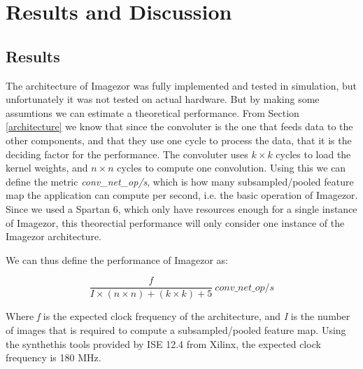 \chapter{Results and Discussion} \label{chap_results}

\section{Results}

The architecture of Imagezor was fully implemented and tested in simulation, but unfortunately it was not tested on actual hardware. But by making some assumtions we can estimate a theoretical performance. From Section \ref{architecture} we know that since the convoluter is the one that feeds data to the other components, and that they use one cycle to process the data, that it is the deciding factor for the performance. The convoluter uses $ k \times k $ cycles to load the kernel weights, and $ n \times n $ cycles to compute one convolution.  Using this we can define the metric \textit{conv\_net\_op/s}, which is how many subsampled/pooled feature map the application can compute per second, i.e. the basic operation of Imagezor. Since we used a Spartan 6, which only have resources enough for a single instance of Imagezor, this theorectial performance will only consider one instance of the Imagezor architecture.  

We can thus define the performance of Imagezor as:

\begin{equation} \label{eq_theoretical_performance}
\frac{f}{I\times(n \times n) + (k \times k) + 5} ~conv\_net\_op/s
\end{equation}

Where \textit{f} is the expected clock frequency of the architecture, and \textit{I} is the number of images that is required to compute a subsampled/pooled feature map. Using the synthethis tools provided by ISE 12.4 from Xilinx, the expected clock frequency is 180 MHz.

